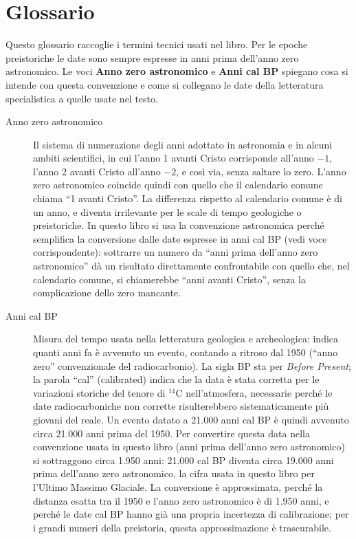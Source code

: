 \chapter*{Glossario}

Questo glossario raccoglie i termini tecnici usati nel libro. Per le epoche preistoriche le date sono sempre espresse in anni prima dell'anno zero astronomico. Le voci \textbf{Anno zero astronomico} e \textbf{Anni cal BP} spiegano cosa si intende con questa convenzione e come si collegano le date della letteratura specialistica a quelle usate nel testo.

\begin{description}

\item[Anno zero astronomico] Il sistema di numerazione degli anni adottato in astronomia e in alcuni ambiti scientifici, in cui l'anno 1 avanti Cristo corrisponde all'anno $-1$, l'anno 2 avanti Cristo all'anno $-2$, e così via, senza saltare lo zero. L'anno zero astronomico coincide quindi con quello che il calendario comune chiama ``1 avanti Cristo''. La differenza rispetto al calendario comune è di un anno, e diventa irrilevante per le scale di tempo geologiche o preistoriche. In questo libro si usa la convenzione astronomica perché semplifica la conversione dalle date espresse in anni cal BP (vedi voce corrispondente): sottrarre un numero da ``anni prima dell'anno zero astronomico'' dà un risultato direttamente confrontabile con quello che, nel calendario comune, si chiamerebbe ``anni avanti Cristo'', senza la complicazione dello zero mancante.

\item[Anni cal BP] Misura del tempo usata nella letteratura geologica e archeologica: indica quanti anni fa è avvenuto un evento, contando a ritroso dal 1950 (``anno zero'' convenzionale del radiocarbonio). La sigla BP sta per \textit{Before Present}; la parola ``cal'' (calibrated) indica che la data è stata corretta per le variazioni storiche del tenore di $^{14}$C nell'atmosfera, necessarie perché le date radiocarboniche non corrette risulterebbero sistematicamente più giovani del reale. Un evento datato a 21.000 anni cal BP è quindi avvenuto circa 21.000 anni prima del 1950. Per convertire questa data nella convenzione usata in questo libro (anni prima dell'anno zero astronomico) si sottraggono circa 1.950 anni: 21.000 cal BP diventa circa 19.000 anni prima dell'anno zero astronomico, la cifra usata in questo libro per l'Ultimo Massimo Glaciale. La conversione è approssimata, perché la distanza esatta tra il 1950 e l'anno zero astronomico è di 1.950 anni, e perché le date cal BP hanno già una propria incertezza di calibrazione; per i grandi numeri della preistoria, questa approssimazione è trascurabile.


\end{description}
